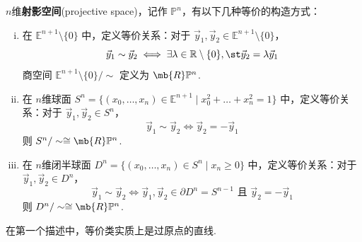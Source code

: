 \begin{definition}[射影空间]
    $n$维\textbf{射影空间}(projective space)，记作 $\mathbb{P}^n$，有以下几种等价的构造方式：
    \begin{enumerate}[(i)]
        \item 在 $\mathbb{E}^{n+1}\setminus\{0\}$ 中，定义等价关系：对于 $\vec{y}_1, \vec{y}_2 \in \mathbb{E}^{n+1}\setminus\{0\}$，
        \[ \vec{y}_1 \sim \vec{y}_2 \iff \exists \lambda \in \mathbb{R}\setminus\{0\}, \st \vec{y}_2 = \lambda \vec{y}_1 \]
        商空间 $\mathbb{E}^{n+1}\setminus\{0\}/\sim$ 定义为 $\mb{R}\mathbb{P}^n$.
        \item 在 $n$维球面 $S^n = \{ (x_0, \dots, x_n) \in \mathbb{E}^{n+1} \mid x_0^2 + \dots + x_n^2 = 1 \}$ 中，定义等价关系：对于 $\vec{y}_1, \vec{y}_2 \in S^n$，
        \[ \vec{y}_1 \sim \vec{y}_2 \iff \vec{y}_2 = -\vec{y}_1 \]
        则 $S^n/\sim \cong \mb{R}\mathbb{P}^n$.
        \item 在 $n$维闭半球面 $D^n = \{ (x_0, \dots, x_n) \in S^n \mid x_n \geq 0 \}$ 中，定义等价关系：对于 $\vec{y}_1, \vec{y}_2 \in D^n$，
        \[ \vec{y}_1 \sim \vec{y}_2 \iff \vec{y}_1, \vec{y}_2 \in \partial D^n = S^{n-1} \text{ 且 } \vec{y}_2 = -\vec{y}_1 \]
        则 $D^n/\sim \cong \mb{R}\mathbb{P}^n$.
    \end{enumerate}
\end{definition}
在第一个描述中，等价类实质上是过原点的直线.




